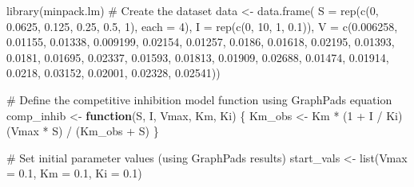 \documentclass[
  letterpaper,
  DIV=11,
  numbers=noendperiod]{scrreprt}
\newenvironment{Shaded}{\begin{snugshade}}{\end{snugshade}}
\newcommand{\AttributeTok}[1]{\textcolor[rgb]{0.40,0.45,0.13}{#1}}
\newcommand{\CommentTok}[1]{\textcolor[rgb]{0.37,0.37,0.37}{#1}}
\newcommand{\ControlFlowTok}[1]{\textcolor[rgb]{0.00,0.23,0.31}{\textbf{#1}}}
\newcommand{\DecValTok}[1]{\textcolor[rgb]{0.68,0.00,0.00}{#1}}
\newcommand{\FloatTok}[1]{\textcolor[rgb]{0.68,0.00,0.00}{#1}}
\newcommand{\FunctionTok}[1]{\textcolor[rgb]{0.28,0.35,0.67}{#1}}
\newcommand{\NormalTok}[1]{\textcolor[rgb]{0.00,0.23,0.31}{#1}}
\newcommand{\OtherTok}[1]{\textcolor[rgb]{0.00,0.23,0.31}{#1}}
\newcommand{\SpecialCharTok}[1]{\textcolor[rgb]{0.37,0.37,0.37}{#1}}
\begin{document}
\begin{Shaded}
\begin{Highlighting}[]
\FunctionTok{library}\NormalTok{(minpack.lm)}
\CommentTok{\# Create the dataset}
\NormalTok{data }\OtherTok{\textless{}{-}} \FunctionTok{data.frame}\NormalTok{(}
  \AttributeTok{S =} \FunctionTok{rep}\NormalTok{(}\FunctionTok{c}\NormalTok{(}\DecValTok{0}\NormalTok{, }\FloatTok{0.0625}\NormalTok{, }\FloatTok{0.125}\NormalTok{, }\FloatTok{0.25}\NormalTok{, }\FloatTok{0.5}\NormalTok{, }\DecValTok{1}\NormalTok{), }\AttributeTok{each =} \DecValTok{4}\NormalTok{),}
  \AttributeTok{I =} \FunctionTok{rep}\NormalTok{(}\FunctionTok{c}\NormalTok{(}\DecValTok{0}\NormalTok{, }\DecValTok{10}\NormalTok{, }\DecValTok{1}\NormalTok{, }\FloatTok{0.1}\NormalTok{)),}
  \AttributeTok{V =} \FunctionTok{c}\NormalTok{(}\FloatTok{0.006258}\NormalTok{, }\FloatTok{0.01155}\NormalTok{, }\FloatTok{0.01338}\NormalTok{, }\FloatTok{0.009199}\NormalTok{,}
        \FloatTok{0.02154}\NormalTok{, }\FloatTok{0.01257}\NormalTok{, }\FloatTok{0.0186}\NormalTok{, }\FloatTok{0.01618}\NormalTok{,}
        \FloatTok{0.02195}\NormalTok{, }\FloatTok{0.01393}\NormalTok{, }\FloatTok{0.0181}\NormalTok{, }\FloatTok{0.01695}\NormalTok{,}
        \FloatTok{0.02337}\NormalTok{, }\FloatTok{0.01593}\NormalTok{, }\FloatTok{0.01813}\NormalTok{, }\FloatTok{0.01909}\NormalTok{,}
        \FloatTok{0.02688}\NormalTok{, }\FloatTok{0.01474}\NormalTok{, }\FloatTok{0.01914}\NormalTok{, }\FloatTok{0.0218}\NormalTok{,}
        \FloatTok{0.03152}\NormalTok{, }\FloatTok{0.02001}\NormalTok{, }\FloatTok{0.02328}\NormalTok{, }\FloatTok{0.02541}\NormalTok{))}

\CommentTok{\# Define the competitive inhibition model function using GraphPad\textquotesingle{}s equation}
\NormalTok{comp\_inhib }\OtherTok{\textless{}{-}} \ControlFlowTok{function}\NormalTok{(S, I, Vmax, Km, Ki) \{}
\NormalTok{  Km\_obs }\OtherTok{\textless{}{-}}\NormalTok{ Km }\SpecialCharTok{*}\NormalTok{ (}\DecValTok{1} \SpecialCharTok{+}\NormalTok{ I }\SpecialCharTok{/}\NormalTok{ Ki)}
\NormalTok{  (Vmax }\SpecialCharTok{*}\NormalTok{ S) }\SpecialCharTok{/}\NormalTok{ (Km\_obs }\SpecialCharTok{+}\NormalTok{ S)}
\NormalTok{\}}

\CommentTok{\# Set initial parameter values (using GraphPad\textquotesingle{}s results)}
\NormalTok{start\_vals }\OtherTok{\textless{}{-}} \FunctionTok{list}\NormalTok{(}\AttributeTok{Vmax =} \FloatTok{0.1}\NormalTok{, }\AttributeTok{Km =} \FloatTok{0.1}\NormalTok{, }\AttributeTok{Ki =} \FloatTok{0.1}\NormalTok{)}


\end{Highlighting}
\end{Shaded}
\end{document}
